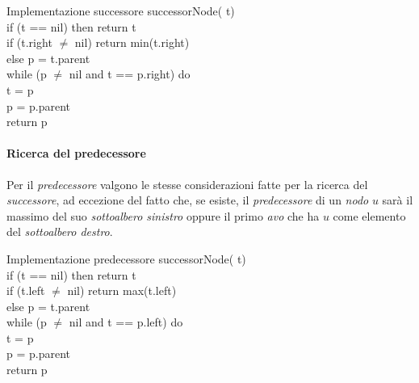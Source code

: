 \begin{minicode}{Implementazione successore}
    \ind{} successorNode( t)\\
        \indf if (t == nil) then
            return t\\
        \indf if (t.right $\neq$ nil)\hfill{}
            return min(t.right)\\
        \indf else\hfill{}
             p = t.parent\\
            \indff while (p $\neq$ nil and t == p.right) do\\
                t = p\\
                p = p.parent\\
            \indff return p
\end{minicode}

\paragraph{Ricerca del predecessore}
Per il \emph{predecessore} valgono le stesse considerazioni fatte per la
ricerca del \emph{successore}, ad eccezione del fatto che, se esiste, il
\emph{predecessore} di un \emph{nodo} $u$ sarà il massimo del suo \emph{sottoalbero
sinistro} oppure il primo \emph{avo} che ha $u$ come elemento del
\emph{sottoalbero destro}.

\begin{minicode}{Implementazione predecessore}
    \ind{} successorNode( t)\\
        \indf if (t == nil) then
            return t\\
        \indf if (t.left $\neq$ nil)\hfill{}
            return max(t.left)\\
        \indf else\hfill{}
             p = t.parent\\
            \indff while (p $\neq$ nil and t == p.left) do\\
                t = p\\
                p = p.parent\\
            \indff return p
\end{minicode}

